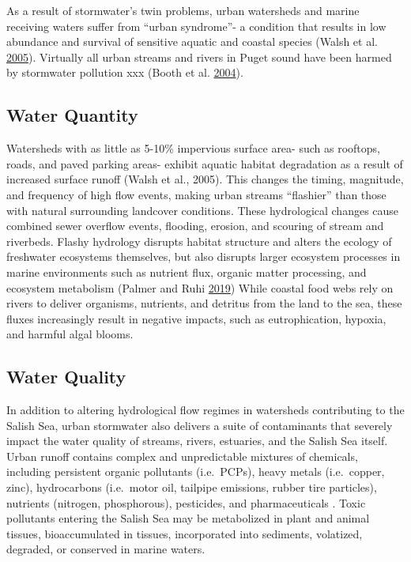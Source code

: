 \documentclass[
]{report}
\begin{document}
As a result of stormwater's twin problems, urban watersheds and marine receiving waters suffer from ``urban syndrome''- a condition that results in low abundance and survival of sensitive aquatic and coastal species (Walsh et al. \protect\hyperlink{ref-Walsh2005}{2005}). Virtually all urban streams and rivers in Puget sound have been harmed by stormwater pollution xxx (Booth et al. \protect\hyperlink{ref-booth2004reviving}{2004}).

\hypertarget{water-quantity}{%
\subsection{Water Quantity}\label{water-quantity}}

Watersheds with as little as 5-10\% impervious surface area- such as rooftops, roads, and paved parking areas- exhibit aquatic habitat degradation as a result of increased surface runoff (Walsh et al., 2005). This changes the timing, magnitude, and frequency of high flow events, making urban streams ``flashier'' than those with natural surrounding landcover conditions. These hydrological changes cause combined sewer overflow events, flooding, erosion, and scouring of stream and riverbeds. Flashy hydrology disrupts habitat structure and alters the ecology of freshwater ecosystems themselves, but also disrupts larger ecosystem processes in marine environments such as nutrient flux, organic matter processing, and ecosystem metabolism (Palmer and Ruhi \protect\hyperlink{ref-Palmer2019}{2019}) While coastal food webs rely on rivers to deliver organisms, nutrients, and detritus from the land to the sea, these fluxes increasingly result in negative impacts, such as eutrophication, hypoxia, and harmful algal blooms.

\hypertarget{water-quality}{%
\subsection{Water Quality}\label{water-quality}}

In addition to altering hydrological flow regimes in watersheds contributing to the Salish Sea, urban stormwater also delivers a suite of contaminants that severely impact the water quality of streams, rivers, estuaries, and the Salish Sea itself. Urban runoff contains complex and unpredictable mixtures of chemicals, including persistent organic pollutants (i.e.~PCPs), heavy metals (i.e.~copper, zinc), hydrocarbons (i.e.~motor oil, tailpipe emissions, rubber tire particles), nutrients (nitrogen, phosphorous), pesticides, and pharmaceuticals . Toxic pollutants entering the Salish Sea may be metabolized in plant and animal tissues, bioaccumulated in tissues, incorporated into sediments, volatized, degraded, or conserved in marine waters.
\end{document}
